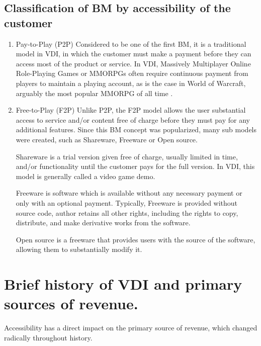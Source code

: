 \documentclass[10pt,british,a4paper,titlepage]{article}
\begin{document}
\subsection{Classification of BM by accessibility of the customer}
\begin{enumerate} 

\item Pay-to-Play (P2P)
Considered to be one of the first BM, it is a traditional model in VDI, in which the customer must make a payment before they can access most of the product or service. In VDI, Massively Multiplayer Online Role-Playing Games or MMORPGs often require continuous payment from players to maintain a playing account, as is the case in World of Warcraft, arguably the most popular MMORPG of all time \cite{IGN:WOW}.

\item Free-to-Play (F2P) 
Unlike P2P, the F2P model allows the user substantial access to service and/or content free of charge before they must pay for any additional features. Since this BM concept was popularized, many sub models were created, such as Shareware, Freeware or Open source.

Shareware is a trial version given free of charge, usually limited in time, and/or functionality until the customer pays for the full version. In VDI, this model is generally called a video game demo\cite{osathanunkul2015classification:business}.

Freeware is software which is available without any necessary payment or only with an optional payment. Typically, Freeware is provided without source code, author retains all other rights, including the rights to copy, distribute, and make derivative works from the software\cite{Graham:LBCI}.

Open source is a freeware that provides users with the source of the software, allowing them to substantially modify it. 

\end{enumerate}




\section{Brief history of VDI and primary sources of revenue.}

Accessibility has a direct impact on the primary source of revenue, which changed radically throughout history.
 
\end{document}
